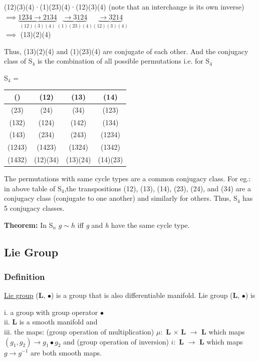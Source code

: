 (12)(3)(4)·(1)(23)(4)·(12)(3)(4) (note that an interchange is its own inverse)  \\
$\implies \underbrace{1234 \rightarrow 2134}_{(12)(3)(4)} \underbrace{ \rightarrow 3124}_{(1)(23)(4)}  \underbrace{ \rightarrow 3214}_{(12)(3)(4)}$ \\ 
$\implies$ (13)(2)(4)

Thus, (13)(2)(4) and (1)(23)(4) are conjugate of each other.
And the conjugacy class of S$_4$ is the combination of all possible permutations i.e. for S$_4$
\begin{center}
    S$_4$ = 
    \begin{tabular}{ |c|c|c|c| } 
     \hline
     () & (12) & (13) & (14)\\ \hline
     (23) & (24) & (34) & (123)\\ \hline
     (132) & (124) & (142) & (134)\\ \hline
     (143) & (234) & (243) & (1234)\\ \hline
     (1243) & (1423) & (1324) & (1342)\\ \hline
     (1432) & (12)(34) & (13)(24) & (14)(23) \\
     \hline
    \end{tabular}
\end{center}

The permutations with same cycle types are a common conjugacy class. 
For eg.: in above table of S$_4$,the transpositions (12), (13), (14), (23), (24), and (34) are a conjugacy class (conjugate to one another) and similarly for others.
Thus, S$_4$ has 5 conjugacy classes.

\textbf{Theorem: } In S$_n$ $g \sim h$ iff \textit{g} and \textit{h} have the same cycle type.

\subsection{Lie Group}
\subsubsection{Definition}
\href{https://aimath.org/E8/liegroup.html#:~:text=Lie%20groups%20lie%20at%20the,are%20examples%20of%20smooth%20manifolds.}{Lie group}
(\textbf{L}, $\bullet$) is a group that is also differentiable manifold. Lie group (\textbf{L}, $\bullet$) is

i. a group with group operator $\bullet$ \\
ii. \textbf{L} is a smooth manifold and \\
iii. the maps: (group operation of multiplication) $\mu :$ \textbf{L} $\times$ \textbf{L} $\rightarrow$ \textbf{L} which maps $(g_1, g_2) \rightarrow g_1\bullet g_2$ and
(group operation of inversion) $i :$ \textbf{L} $\rightarrow$ \textbf{L} which maps $g \rightarrow g^{-1}$ are both smooth maps.

